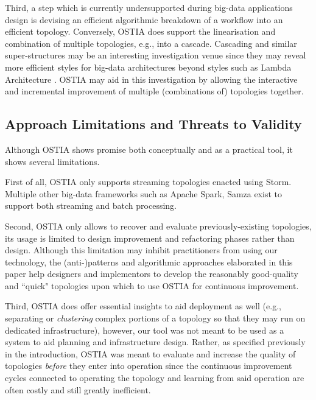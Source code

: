 Third, a step which is currently undersupported during big-data applications design is devising an efficient algorithmic breakdown of a workflow into an efficient topology. Conversely, OSTIA does support the linearisation and combination of multiple topologies, e.g., into a cascade. Cascading and similar super-structures may be an interesting investigation venue since they may reveal more efficient styles for big-data architectures beyond styles such as Lambda Architecture \cite{lambda}. OSTIA may aid in this investigation by allowing the interactive and incremental improvement of multiple (combinations of) topologies together.

\subsection{Approach Limitations and Threats to Validity}\label{lim}

Although OSTIA shows promise both conceptually and as a practical tool, it shows several limitations.

First of all, OSTIA only supports streaming topologies enacted using Storm. Multiple other big-data frameworks such as Apache Spark, Samza exist to support both streaming and batch processing. 

Second, OSTIA only allows to recover and evaluate previously-existing topologies, its usage is limited to design improvement and refactoring phases rather than design. Although this limitation may inhibit practitioners from using our technology, the (anti-)patterns and algorithmic approaches elaborated in this paper help designers and implementors to develop the reasonably good-quality and ``quick" topologies upon which to use OSTIA for continuous improvement.

Third, OSTIA does offer essential insights to aid deployment as well (e.g., separating or \emph{clustering} complex portions of a topology so that they may run on dedicated infrastructure), however, our tool was not meant to be used as a system to aid planning and infrastructure design. Rather, as specified previously in the introduction, OSTIA was meant to evaluate and increase the quality of topologies \emph{before} they enter into operation since the continuous improvement cycles connected to operating the topology and learning from said operation are often costly and still greatly inefficient.

